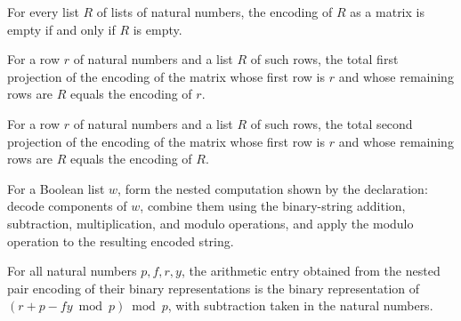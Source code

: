 \begin{theorem}
\label{Complexity.BinArith.encMat_eq_nil_iff}
\leanok
{}
For every list $R$ of lists of natural numbers, the encoding of $R$ as a matrix is empty
if and only if $R$ is empty.
\end{theorem}

\begin{theorem}
\label{Complexity.BinArith.pairFstD_encMat_cons}
\leanok
{}
For a row $r$ of natural numbers and a list $R$ of such rows, the total first projection
of the encoding of the matrix whose first row is $r$ and whose remaining rows are $R$
equals the encoding of $r$.
\end{theorem}

\begin{theorem}
\label{Complexity.BinArith.pairSndD_encMat_cons}
\leanok
{}
For a row $r$ of natural numbers and a list $R$ of such rows, the total second
projection of the encoding of the matrix whose first row is $r$ and whose remaining rows
are $R$ equals the encoding of $R$.
\end{theorem}

\begin{definition}
\label{Complexity.BinArith.entryW}
\leanok
{}
For a Boolean list $w$, form the nested computation shown by the declaration: decode
components of $w$, combine them using the binary-string addition, subtraction,
multiplication, and modulo operations, and apply the modulo operation to the resulting
encoded string.
\end{definition}

\begin{theorem}
\label{Complexity.BinArith.entryW_eq}
\leanok
{}
For all natural numbers $p,f,r,y$, the arithmetic entry obtained from the nested pair
encoding of their binary representations is the binary representation of $(r+p-fy\bmod
p)\bmod p$, with subtraction taken in the natural numbers.
\end{theorem}

